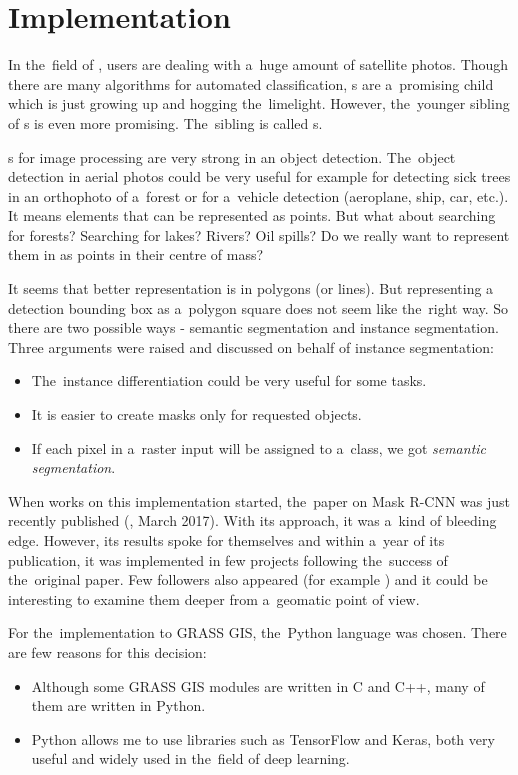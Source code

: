 \chapter{Implementation}
\label{implementation}

In the~field of , users are dealing with a~huge amount of satellite photos.
Though there are many algorithms for automated classification, s are
a~promising child which is just growing up and hogging the~limelight. However,
the~younger sibling of s is even more promising. The~sibling is called 
s.

s for image processing are very strong in an object detection.
The~object detection in aerial photos could be very useful for example for detecting 
sick trees in an orthophoto of a~forest or for a~vehicle detection (aeroplane, 
ship, car, etc.). It means elements that can be represented as points. But what 
about searching for forests? Searching for lakes? Rivers? Oil spills? Do we 
really want to represent them in  as points in their centre of mass?

It seems that better representation is in polygons (or lines). But representing
a detection bounding box as a~polygon square does not seem like the~right way. 
So there are two possible ways - semantic segmentation and instance 
segmentation. Three arguments were raised and discussed on behalf of instance 
segmentation:
\begin{itemize}
	\item The~instance differentiation could be very useful for some tasks.
	\item It is easier to create masks only for requested objects.
	\item If each pixel in a~raster input will be assigned to a~class, we got
	\textit{semantic segmentation}.
\end{itemize}

When works on this implementation started, the~paper on Mask R-CNN was just 
recently published (\cite{mask-rcnn}, March 2017). With its approach, it was
a~kind of bleeding edge. However, its results spoke for themselves and within
a~year of its publication, it was implemented in few projects following
the~success of the~original paper. Few followers also appeared (for example 
\cite{masklab}) and it could be interesting to examine them deeper from
a~geomatic point of view.

For the~implementation to GRASS GIS, the~Python language was chosen. There are
few reasons for this decision:
\begin{itemize}
	\item Although some GRASS GIS modules are written in C and C++, many of them
	are written in Python.
	\item Python allows me to use libraries such as TensorFlow and Keras, both
	very useful and widely used in the~field of deep learning. 
\end{itemize}

